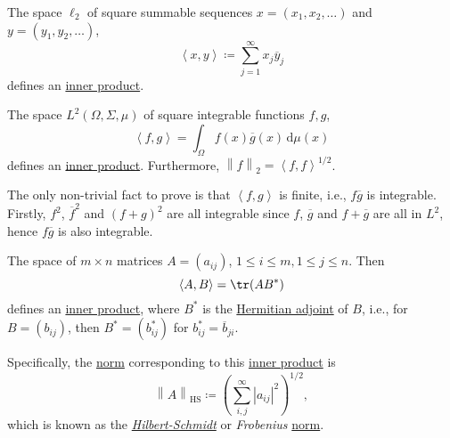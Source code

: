 \begin{eg}
	The space \(\ell _2\) of square summable sequences \(x=(x_1, x_2, \ldots  )\) and \(y=(y_1, y_2, \ldots  )\),
	\[
		\left\langle x, y \right\rangle \coloneqq \sum_{j=1}^{\infty} x_j \overline{y} _j
	\]
	defines an \hyperref[def:inner-product]{inner product}.
\end{eg}

\begin{eg}
	The space \(L^2(\Omega , \Sigma , \mu )\) of square integrable functions \(f, g\),
	\[
		\left\langle f, g \right\rangle = \int _\Omega f(x) \overline{g} (x)\,\mathrm{d} \mu (x)
	\]
	defines an \hyperref[def:inner-product]{inner product}. Furthermore, \(\left\lVert f\right\rVert _2 = \left\langle f, f \right\rangle ^{1 / 2}\).
\end{eg}
\begin{explanation}
	The only non-trivial fact to prove is that \(\left\langle f, g \right\rangle \) is finite, i.e., \(f \overline{g} \) is integrable. Firstly, \(f^{2} \), \(\overline{f} ^{2} \) and \((f + g)^{2} \) are all integrable since \(f\), \(\overline{g} \) and \(f+\overline{g} \) are all in \(L^2\), hence \(f \overline{g} \) is also integrable.
\end{explanation}

\begin{eg}
	The space of \(m \times n\) matrices \(A = (a_{ij} )\), \(1 \leq i\leq m, 1 \leq j\leq n\). Then
	\[
		\left\langle A, B \right\rangle = \tr(A B^{\ast})
	\]
	defines an \hyperref[def:inner-product]{inner product}, where \(B^{\ast} \) is the \href{https://en.wikipedia.org/wiki/Hermitian_adjoint}{Hermitian adjoint} of \(B\), i.e., for \(B = (b_{ij})\), then \(B^{\ast} = (b^{\ast} _{ij})\) for \(b^{\ast} _{ij} = \overline{b}_{ji}\).

	\begin{remark}
		Specifically, the \hyperref[def:norm]{norm} corresponding to this \hyperref[def:inner-product]{inner product} is
		\[
			\left\lVert A\right\rVert _{\mathrm{HS} }\coloneqq \left(\sum_{i, j}^{\infty} \left\vert a_{ij}  \right\vert ^{2} \right)^{1 / 2},
		\]
		which is known as the \href{https://en.wikipedia.org/wiki/Hilbert%E2%80%93Schmidt_operator}{\emph{Hilbert-Schmidt}} or \emph{Frobenius} \hyperref[def:norm]{norm}.
	\end{remark}
\end{eg}

